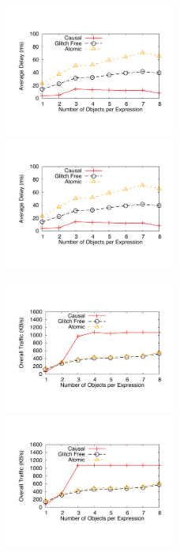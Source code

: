 \documentclass[11pt]{article}
\begin{document}
\begin{figure}
	\includegraphics[width=0.5\textwidth]{graphs/numGraphDependenciesDelay}
	\includegraphics[width=0.5\textwidth]{referencegraphs/numGraphDependenciesDelay}
\end{figure}
\begin{figure}
	\includegraphics[width=0.5\textwidth]{graphs/numGraphDependenciesTraffic}
	\includegraphics[width=0.5\textwidth]{referencegraphs/numGraphDependenciesTraffic}
\end{figure}
\end{document}
